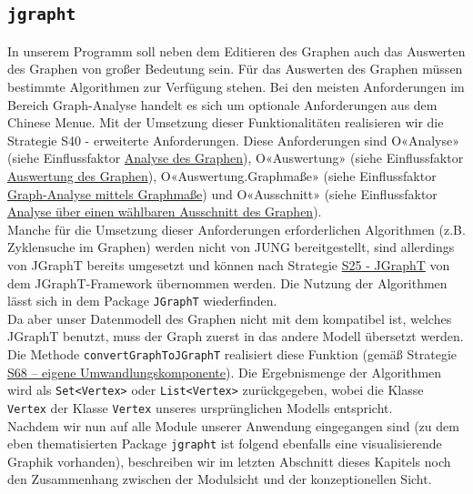 \documentclass[enabledeprecatedfontcommands,fontsize=11pt,paper=a4,twoside]{scrartcl}
\newcounter{one}
\begin{document}
\subsection{\texttt{jgrapht}}
In unserem Programm soll neben dem Editieren des Graphen auch das Auswerten des Graphen von großer Bedeutung sein. Für das Auswerten des Graphen müssen bestimmte Algorithmen zur Verfügung stehen. Bei den meisten Anforderungen im Bereich Graph-Analyse handelt es sich um optionale Anforderungen aus dem Chinese Menue. Mit der Umsetzung dieser Funktionalitäten realisieren wir die Strategie \hypertarget{nnn}{S40 - erweiterte Anforderungen}. Diese Anforderungen sind O«Analyse» (siehe Einflussfaktor \hyperlink {oo}{Analyse des Graphen}), O«Auswertung» (siehe Einflussfaktor \hyperlink {pp}{Auswertung des Graphen}), O«Auswertung.Graphmaße» (siehe Einflussfaktor \hyperlink {qq}{Graph-Analyse mittels Graphmaße}) und O«Ausschnitt» (siehe Einflussfaktor \hyperlink {rr}{Analyse über einen wählbaren Ausschnitt des Graphen}). \\ Manche für die Umsetzung dieser Anforderungen erforderlichen Algorithmen (z.B. Zyklensuche im Graphen) werden nicht von JUNG bereitgestellt, sind allerdings von JGraphT bereits umgesetzt und können nach Strategie \hyperlink{xxx}{S25 - JGraphT} von dem JGraphT-Framework übernommen werden. Die Nutzung der Algorithmen lässt sich in dem Package \texttt{JGraphT} wiederfinden.\\
Da aber unser Datenmodell des Graphen nicht mit dem kompatibel ist, welches JGraphT benutzt, muss der Graph zuerst in das andere Modell übersetzt werden. Die Methode \texttt{convertGraphToJGraphT} realisiert diese Funktion (gemäß Strategie \hyperlink{umwandlungskomponente}{S68 – eigene Umwandlungskomponente}). Die Ergebnismenge der Algorithmen wird als \texttt{Set<Vertex>} oder \texttt{List<Vertex>} zurückgegeben, wobei die Klasse \texttt{Vertex} der Klasse \texttt{Vertex} unseres ursprünglichen Modells entspricht. \\ 

Nachdem wir nun auf alle Module unserer Anwendung eingegangen sind (zu dem eben thematisierten Package \texttt{jgrapht} ist folgend ebenfalls eine visualisierende Graphik vorhanden), beschreiben wir im letzten Abschnitt dieses Kapitels noch den Zusammenhang zwischen der Modulsicht und der konzeptionellen Sicht.


\end{document}
